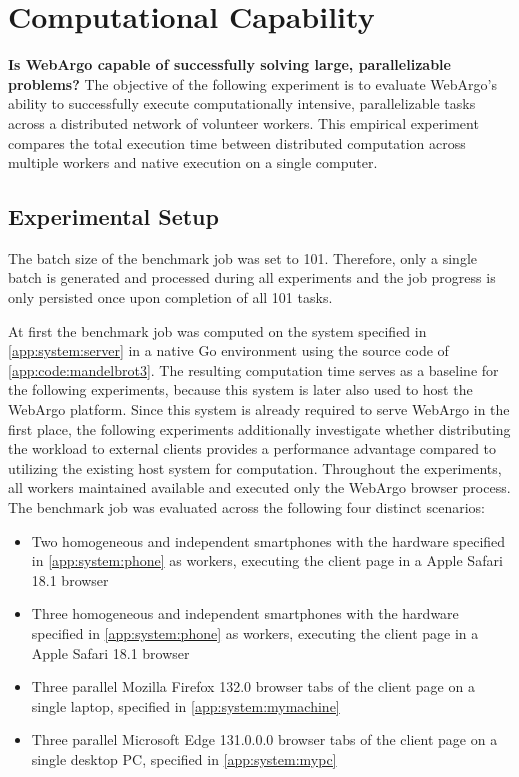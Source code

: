 \section{Computational Capability}
\label{sec:evaluation:computation}
\textbf{Is WebArgo capable of successfully solving large, parallelizable problems?} 
\newline
The objective of the following experiment is to evaluate WebArgo's ability to successfully execute computationally intensive, parallelizable tasks across a distributed network of volunteer workers. This empirical experiment compares the total execution time between distributed computation across multiple workers and native execution on a single computer.

\subsection{Experimental Setup}
The batch size of the benchmark job was set to 101. Therefore, only a single batch is generated and processed during all experiments and the job progress is only persisted once upon completion of all 101 tasks.

At first the benchmark job was computed on the system specified in \autoref{app:system:server} in a native Go environment using the source code of \autoref{app:code:mandelbrot3}. The resulting computation time serves as a baseline for the following experiments, because this system is later also used to host the WebArgo platform. Since this system is already required to serve WebArgo in the first place, the following experiments additionally investigate whether distributing the workload to external clients provides a performance advantage compared to utilizing the existing host system for computation. Throughout the experiments, all workers maintained available and executed only the WebArgo browser process. The benchmark job was evaluated across the following four distinct scenarios:
\begin{itemize}
    \item Two homogeneous and independent smartphones with the hardware specified in \autoref{app:system:phone} as workers, executing the client page in a Apple Safari 18.1 \cite{evaluation:safari} browser
    \item Three homogeneous and independent smartphones with the hardware specified in \autoref{app:system:phone} as workers, executing the client page in a Apple Safari 18.1 \cite{evaluation:safari} browser
    \item Three parallel Mozilla Firefox 132.0 \cite{background:firefox} browser tabs of the client page on a single laptop, specified in \autoref{app:system:mymachine}
    \item Three parallel Microsoft Edge 131.0.0.0 \cite{evaluation:edge} browser tabs of the client page on a single desktop \ac{PC}, specified in \autoref{app:system:mypc}
\end{itemize}

